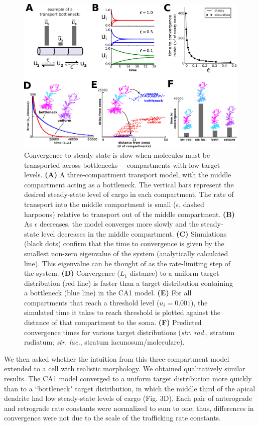 \documentclass[11pt]{wlpeerj}
\begin{document}
\begin{figure}[!tb]
\begin{center}
\includegraphics[width=0.9\columnwidth]{03_convergence.png}
\caption{ Convergence to steady-state is slow when molecules must be transported across bottlenecks ---compartments with low target levels.
\textbf{(A)} A three-compartment transport model, with the middle compartment acting as a bottleneck. The vertical bars represent the desired steady-state level of cargo in each compartment. The rate of transport into the middle compartment is small ($\epsilon$, dashed harpoons) relative to transport out of the middle compartment.
\textbf{(B)} As $\epsilon$ decreases, the model converges more slowly and the steady-state level decreases in the middle compartment.
\textbf{(C)} Simulations (black dots) confirm that the time to convergence is given by the smallest non-zero eigenvalue of the system (analytically calculated line). This eigenvalue can be thought of as the rate-limiting step of the system.
\textbf{(D)} Convergence ($L_1$ distance) to a uniform target distribution (red line) is faster than a target distribution containing a bottleneck (blue line) in the CA1 model.
\textbf{(E)} For all compartments that reach a threshold level ($u_i = 0.001$), the simulated time it takes to reach threshold is plotted against the distance of that compartment to the soma.
\textbf{(F)} Predicted convergence times for various target distributions (\textit{str. rad.}, stratum radiatum; \textit{str. lac.}, stratum lacunosum/moleculare).}
\end{center}
\end{figure}

We then asked whether the intuition from this three-compartment model extended to a cell with realistic morphology.
We obtained qualitatively similar results.
The CA1 model converged to a uniform target distribution more quickly than to a ``bottleneck" target distribution, in which the middle third of the apical dendrite had low steady-state levels of cargo (Fig. 3D).
Each pair of anterograde and retrograde rate constants were normalized to sum to one; thus, differences in convergence were not due to the scale of the trafficking rate constants.
\end{document}
